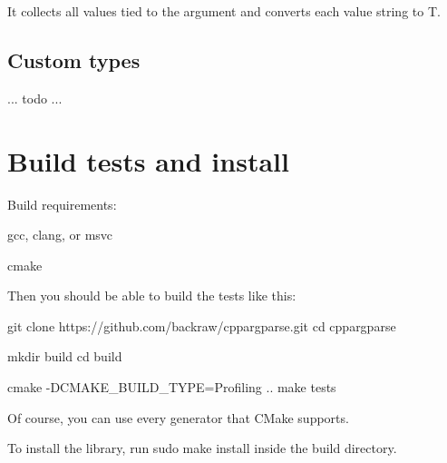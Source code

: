 It collects all values tied to the argument and converts each value string to {\ttfamily T}.

\subsection*{Custom types}

... todo ...

\section*{Build tests and install}

Build requirements\+:
\begin{DoxyItemize}
\item {\ttfamily gcc}, {\ttfamily clang}, or {\ttfamily msvc}
\item {\ttfamily cmake}
\end{DoxyItemize}

Then you should be able to build the tests like this\+: 
\begin{DoxyCode}
git clone https://github.com/backraw/cppargparse.git
cd cppargparse

mkdir build
cd build

cmake -DCMAKE\_BUILD\_TYPE=Profiling ..
make tests
\end{DoxyCode}


Of course, you can use every generator that C\+Make supports.

To install the library, run {\ttfamily sudo make install} inside the build directory. 